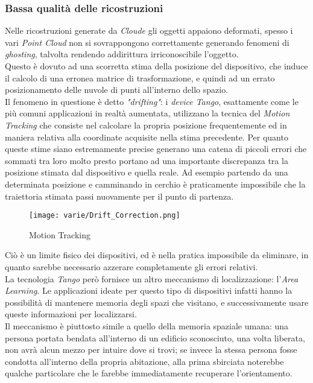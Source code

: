 \subsubsection{Bassa qualità delle ricostruzioni}
Nelle ricostruzioni generate da \emph{Cloude} gli oggetti appaiono deformati, spesso i vari \emph{Point Cloud} non si sovrappongono correttamente generando fenomeni di \emph{ghosting}, talvolta rendendo addirittura irriconoscibile l'oggetto.\\
Questo è dovuto ad una scorretta stima della posizione del dispositivo, che induce il calcolo di una erronea matrice di trasformazione, e quindi ad un errato posizionamento delle nuvole di punti all'interno dello spazio.\\
Il fenomeno in questione è detto \emph{"drifting"}: i \emph{device Tango}, esattamente come le più comuni applicazioni in realtà aumentata, utilizzano la tecnica del \emph{Motion Tracking} che consiste nel calcolare la propria posizione frequentemente ed in maniera relativa alla coordinate acquisite nella stima precedente. Per quanto queste stime siano estremamente precise generano una catena di piccoli errori che sommati tra loro molto presto portano ad una importante discrepanza tra la posizione stimata dal dispositivo e quella reale. Ad esempio partendo da una determinata posizione e camminando in cerchio è praticamente impossibile che la traiettoria stimata passi nuovamente per il punto di partenza.
\begin{figure}[!h] 
    \centering 
    \texttt{[image: varie/Drift\_Correction.png]} 
    \caption{Motion Tracking}
\end{figure}
Ciò è un limite fisico dei dispositivi, ed è nella pratica impossibile da eliminare, in quanto sarebbe necessario azzerare completamente gli errori relativi.\\
La tecnologia \emph{Tango} però fornisce un altro meccanismo di localizzazione: l'\emph{Area Learning}. Le applicazioni ideate per questo tipo di dispositivi infatti hanno la possibilità di mantenere memoria degli spazi che visitano, e successivamente usare queste informazioni per localizzarsi.\\
Il meccanismo è piuttosto simile a quello della memoria spaziale umana: una persona portata bendata all'interno di un edificio sconosciuto, una volta liberata, non avrà alcun mezzo per intuire dove si trovi; se invece la stessa persona fosse condotta all'interno della propria abitazione, alla prima sbirciata noterebbe qualche particolare che le farebbe immediatamente recuperare l'orientamento.\\
